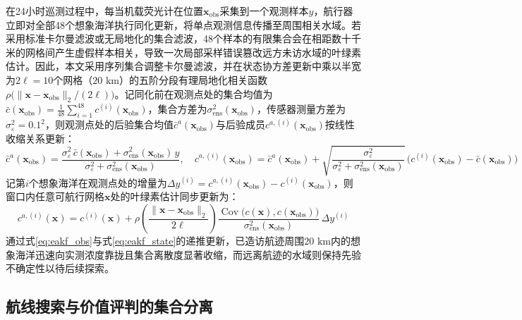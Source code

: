 在24小时巡测过程中，每当机载荧光计在位置$\mathbf{x}_{\text{obs}}$采集到一个观测样本$y$，航行器立即对全部48个想象海洋执行同化更新，将单点观测信息传播至周围相关水域。若采用标准卡尔曼滤波或无局地化的集合滤波，48个样本的有限集合会在相距数十千米的网格间产生虚假样本相关，导致一次局部采样错误篡改远方未访水域的叶绿素估计。因此，本文采用序列集合调整卡尔曼滤波\cite{anderson2001eakf}，并在状态协方差更新中乘以半宽为$2\ell = 10$个网格（$20\text{ km}$）的五阶分段有理局地化相关函数$\rho\!\big(\|\mathbf{x}-\mathbf{x}_{\text{obs}}\|_2 / (2\ell)\big)$\cite{gaspari1999correlation}。记同化前在观测点处的集合均值为$\bar{c}(\mathbf{x}_{\text{obs}}) = \frac{1}{48}\sum_{i=1}^{48} c^{(i)}(\mathbf{x}_{\text{obs}})$，集合方差为$\sigma_{\text{ens}}^2(\mathbf{x}_{\text{obs}})$，传感器测量方差为$\sigma_{\varepsilon}^2 = 0.1^2$，则观测点处的后验集合均值$\bar{c}^a(\mathbf{x}_{\text{obs}})$与后验成员$c^{a,(i)}(\mathbf{x}_{\text{obs}})$按线性收缩关系更新：
\begin{equation}
  \bar{c}^a(\mathbf{x}_{\text{obs}}) = \frac{\sigma_{\varepsilon}^2\,\bar{c}(\mathbf{x}_{\text{obs}}) + \sigma_{\text{ens}}^2(\mathbf{x}_{\text{obs}})\,y}{\sigma_{\varepsilon}^2 + \sigma_{\text{ens}}^2(\mathbf{x}_{\text{obs}})}, \quad
  c^{a,(i)}(\mathbf{x}_{\text{obs}}) = \bar{c}^a(\mathbf{x}_{\text{obs}}) + \sqrt{\frac{\sigma_{\varepsilon}^2}{\sigma_{\varepsilon}^2 + \sigma_{\text{ens}}^2(\mathbf{x}_{\text{obs}})}}\,\Big(c^{(i)}(\mathbf{x}_{\text{obs}}) - \bar{c}(\mathbf{x}_{\text{obs}})\Big)
  \label{eq:eakf_obs}
\end{equation}
记第$i$个想象海洋在观测点处的增量为$\Delta y^{(i)} = c^{a,(i)}(\mathbf{x}_{\text{obs}}) - c^{(i)}(\mathbf{x}_{\text{obs}})$，则窗口内任意可航行网格$\mathbf{x}$处的叶绿素估计同步更新为：
\begin{equation}
  c^{a,(i)}(\mathbf{x}) = c^{(i)}(\mathbf{x}) + \rho\!\left(\frac{\|\mathbf{x}-\mathbf{x}_{\text{obs}}\|_2}{2\ell}\right)\frac{\operatorname{Cov}\!\big(c(\mathbf{x}), c(\mathbf{x}_{\text{obs}})\big)}{\sigma_{\text{ens}}^2(\mathbf{x}_{\text{obs}})}\,\Delta y^{(i)}
  \label{eq:eakf_state}
\end{equation}
通过式\eqref{eq:eakf_obs}与式\eqref{eq:eakf_state}的递推更新，已造访航迹周围$20\text{ km}$内的想象海洋迅速向实测浓度靠拢且集合离散度显著收缩，而远离航迹的水域则保持先验不确定性以待后续探索。

\subsection{航线搜索与价值评判的集合分离}

